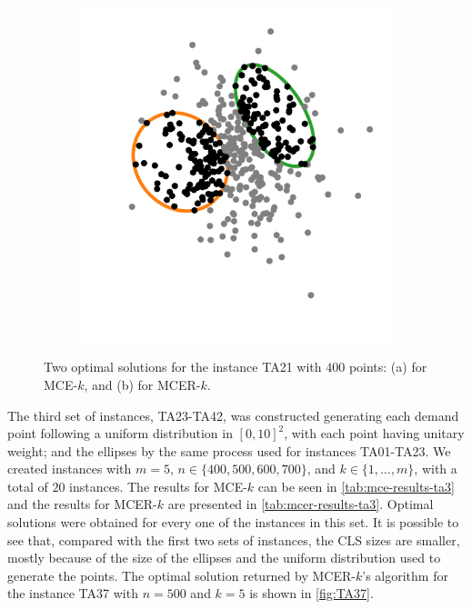 \begin{figure}
\begin{subfigure}{.5\textwidth}
		\includegraphics[scale=.9]{tex/figures/MCER_TA21}
		\caption{}
		\label{fig:MCER_TA21}
	\end{subfigure}
	\caption{Two optimal solutions for the instance TA21 with $400$ points: (a) for MCE-$k$, and (b) for MCER-$k$.}
	\label{fig:TA21}
\end{figure}

The third set of instances, TA23-TA42, was constructed generating each demand point following a uniform distribution in $[0, 10]^2$, with each point having unitary weight; and the ellipses by the same process used for instances TA01-TA23. We created instances with $m=5$, $n\in \{400, 500, 600, 700\}$, and $k\in\{1, \dots, m\}$, with a total of $20$ instances. The results for MCE-$k$ can be seen in \autoref{tab:mce-results-ta3} and the results for MCER-$k$ are presented in \autoref{tab:mcer-results-ta3}. Optimal solutions were obtained for every one of the instances in this set. It is possible to see that, compared with the first two sets of instances, the CLS sizes are smaller, mostly because of the size of the ellipses and the uniform distribution used to generate the points. The optimal solution returned by MCER-$k$'s algorithm for the instance TA37 with $n=500$ and $k=5$ is shown in \autoref{fig:TA37}.

